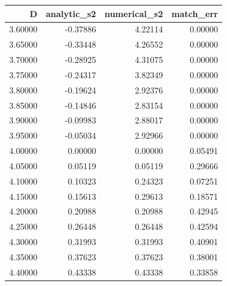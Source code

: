 \begin{tabular}{rrrr}
\toprule
D & analytic_s2 & numerical_s2 & match_err \\
\midrule
3.60000 & -0.37886 & 4.22114 & 0.00000 \\
3.65000 & -0.33448 & 4.26552 & 0.00000 \\
3.70000 & -0.28925 & 4.31075 & 0.00000 \\
3.75000 & -0.24317 & 3.82349 & 0.00000 \\
3.80000 & -0.19624 & 2.92376 & 0.00000 \\
3.85000 & -0.14846 & 2.83154 & 0.00000 \\
3.90000 & -0.09983 & 2.88017 & 0.00000 \\
3.95000 & -0.05034 & 2.92966 & 0.00000 \\
4.00000 & 0.00000 & 0.00000 & 0.05491 \\
4.05000 & 0.05119 & 0.05119 & 0.29666 \\
4.10000 & 0.10323 & 0.24323 & 0.07251 \\
4.15000 & 0.15613 & 0.29613 & 0.18571 \\
4.20000 & 0.20988 & 0.20988 & 0.42945 \\
4.25000 & 0.26448 & 0.26448 & 0.42594 \\
4.30000 & 0.31993 & 0.31993 & 0.40901 \\
4.35000 & 0.37623 & 0.37623 & 0.38001 \\
4.40000 & 0.43338 & 0.43338 & 0.33858 \\
\bottomrule
\end{tabular}
